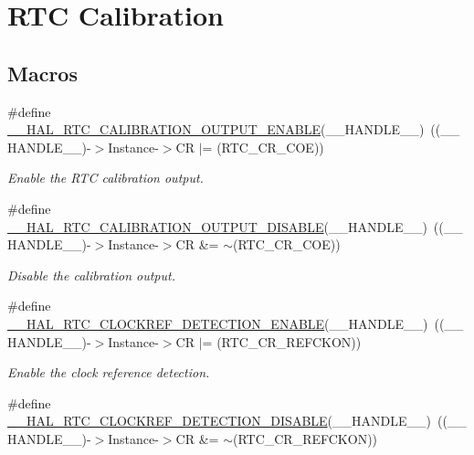 \hypertarget{group___r_t_c_ex___calibration}{}\section{R\+TC Calibration}
\label{group___r_t_c_ex___calibration}
\subsection*{Macros}
\begin{DoxyCompactItemize}
\item 
\#define \hyperlink{group___r_t_c_ex___calibration_ga28ea614bae2c8b94cd3407535644e7a6}{\+\_\+\+\_\+\+H\+A\+L\+\_\+\+R\+T\+C\+\_\+\+C\+A\+L\+I\+B\+R\+A\+T\+I\+O\+N\+\_\+\+O\+U\+T\+P\+U\+T\+\_\+\+E\+N\+A\+B\+LE}(\+\_\+\+\_\+\+H\+A\+N\+D\+L\+E\+\_\+\+\_\+)~((\+\_\+\+\_\+\+H\+A\+N\+D\+L\+E\+\_\+\+\_\+)-\/$>$Instance-\/$>$CR $\vert$= (R\+T\+C\+\_\+\+C\+R\+\_\+\+C\+OE))
\begin{DoxyCompactList}\small\item\em Enable the R\+TC calibration output. \end{DoxyCompactList}\item 
\#define \hyperlink{group___r_t_c_ex___calibration_gab5c03b27e1117cf17be5df483b1211b8}{\+\_\+\+\_\+\+H\+A\+L\+\_\+\+R\+T\+C\+\_\+\+C\+A\+L\+I\+B\+R\+A\+T\+I\+O\+N\+\_\+\+O\+U\+T\+P\+U\+T\+\_\+\+D\+I\+S\+A\+B\+LE}(\+\_\+\+\_\+\+H\+A\+N\+D\+L\+E\+\_\+\+\_\+)~((\+\_\+\+\_\+\+H\+A\+N\+D\+L\+E\+\_\+\+\_\+)-\/$>$Instance-\/$>$CR \&= $\sim$(R\+T\+C\+\_\+\+C\+R\+\_\+\+C\+OE))
\begin{DoxyCompactList}\small\item\em Disable the calibration output. \end{DoxyCompactList}\item 
\#define \hyperlink{group___r_t_c_ex___calibration_ga3fcacefb24751dcb772582e59e50de5e}{\+\_\+\+\_\+\+H\+A\+L\+\_\+\+R\+T\+C\+\_\+\+C\+L\+O\+C\+K\+R\+E\+F\+\_\+\+D\+E\+T\+E\+C\+T\+I\+O\+N\+\_\+\+E\+N\+A\+B\+LE}(\+\_\+\+\_\+\+H\+A\+N\+D\+L\+E\+\_\+\+\_\+)~((\+\_\+\+\_\+\+H\+A\+N\+D\+L\+E\+\_\+\+\_\+)-\/$>$Instance-\/$>$CR $\vert$= (R\+T\+C\+\_\+\+C\+R\+\_\+\+R\+E\+F\+C\+K\+ON))
\begin{DoxyCompactList}\small\item\em Enable the clock reference detection. \end{DoxyCompactList}\item 
\#define \hyperlink{group___r_t_c_ex___calibration_ga8e989c42c1f4139cc1e021c42638d86b}{\+\_\+\+\_\+\+H\+A\+L\+\_\+\+R\+T\+C\+\_\+\+C\+L\+O\+C\+K\+R\+E\+F\+\_\+\+D\+E\+T\+E\+C\+T\+I\+O\+N\+\_\+\+D\+I\+S\+A\+B\+LE}(\+\_\+\+\_\+\+H\+A\+N\+D\+L\+E\+\_\+\+\_\+)~((\+\_\+\+\_\+\+H\+A\+N\+D\+L\+E\+\_\+\+\_\+)-\/$>$Instance-\/$>$CR \&= $\sim$(R\+T\+C\+\_\+\+C\+R\+\_\+\+R\+E\+F\+C\+K\+ON))

\end{DoxyCompactItemize}
